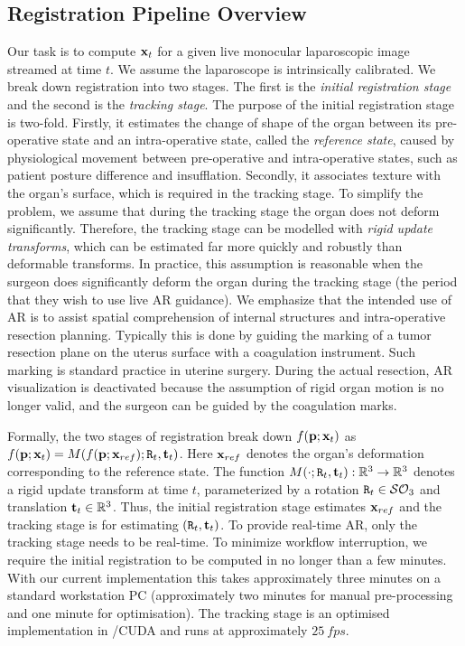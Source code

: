 \subsection{Registration Pipeline Overview}
\label{sec:globalOverview}
Our task is to compute $\mathbf{x}_t$ for a given live monocular laparoscopic image streamed at time $t$. We assume the laparoscope is intrinsically calibrated.
We break down registration into two stages. The first is the \textit{initial registration stage} and the second is the \emph{tracking stage}. The purpose of the initial registration stage is two-fold. Firstly, it estimates the change of shape of the organ between its pre-operative state and an intra-operative state, called the \emph{reference state}, caused by physiological movement between pre-operative and intra-operative states, such as patient posture difference and insufflation. Secondly, it associates texture with the organ's surface, which is required in the tracking stage.
To simplify the problem, we assume that during the tracking stage the organ does not deform significantly. Therefore, the tracking stage can be modelled with \emph{rigid update transforms}, which can be estimated far more quickly and robustly than deformable transforms.
In practice, this assumption is reasonable when the surgeon does significantly deform the organ during the tracking stage (\ie the period that they wish to use live AR guidance). We emphasize that the intended use of AR is to assist spatial comprehension of internal structures and intra-operative resection planning. Typically this is done by guiding the marking of a tumor resection plane on the uterus surface with a coagulation instrument. Such marking is standard practice in uterine surgery. During the actual resection, AR visualization is deactivated because the assumption of rigid organ motion is no longer valid, and the surgeon can be guided by the coagulation marks.

Formally, the two stages of registration break down $f(\mathbf{p};\mathbf{x}_t)$ as $f(\vet{p};\vet{x}_{t})=M(f(\vet{p};\vet{x}_{ref});\mat{R}_{t},\vet{t}_{t})$. Here $\mathbf{x}_{ref}$ denotes the organ's deformation corresponding to the reference state.
The function $M(\cdot;\mat{R}_{t},\vet{t}_{t}):\mathbb{R}^3\rightarrow \mathbb{R}^3$ denotes a rigid update transform at time $t$, parameterized by a rotation $\mat{R}_{t}\in \mathcal{SO}_{3}$ and translation $\mathbf{t}_{t}\in \mathbb{R}^3$.
Thus, the initial registration stage estimates $\mathbf{x}_{ref}$ and the tracking stage is for estimating $(\mat{R}_{t},\vet{t}_{t})$.
To provide real-time AR, only the tracking stage needs to be real-time. To minimize workflow interruption, we require the initial registration to be computed in no longer than a few minutes. With our current implementation this takes approximately three minutes  on a standard workstation PC (approximately two minutes for manual pre-processing and one minute for optimisation). 
The tracking stage is an optimised implementation in \CC/CUDA and runs at approximately $\SI{25}{fps}$.